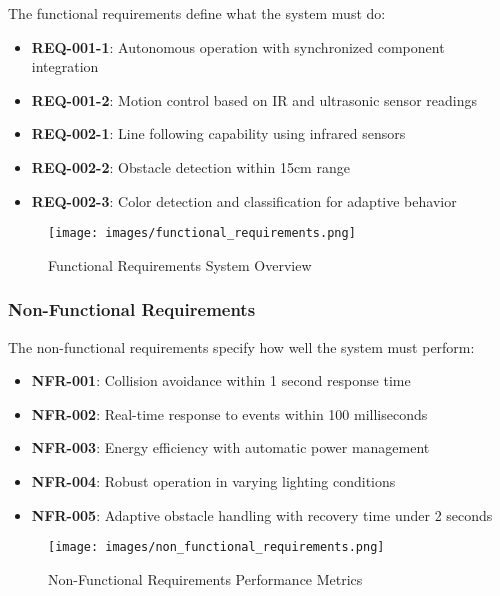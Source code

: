 \documentclass[12pt,a4paper]{article}
\begin{document}
The functional requirements define what the system must do:

\begin{itemize}
    \item \textbf{REQ-001-1}: Autonomous operation with synchronized component integration
    \item \textbf{REQ-001-2}: Motion control based on IR and ultrasonic sensor readings
    \item \textbf{REQ-002-1}: Line following capability using infrared sensors
    \item \textbf{REQ-002-2}: Obstacle detection within 15cm range
    \item \textbf{REQ-002-3}: Color detection and classification for adaptive behavior
\end{itemize}

\begin{figure}[H]
    \centering
    \texttt{[image: images/functional\_requirements.png]}
    \caption{Functional Requirements System Overview}
    \label{fig:functional_requirements}
\end{figure}

\subsubsection{Non-Functional Requirements}

The non-functional requirements specify how well the system must perform:

\begin{itemize}
    \item \textbf{NFR-001}: Collision avoidance within 1 second response time
    \item \textbf{NFR-002}: Real-time response to events within 100 milliseconds
    \item \textbf{NFR-003}: Energy efficiency with automatic power management
    \item \textbf{NFR-004}: Robust operation in varying lighting conditions
    \item \textbf{NFR-005}: Adaptive obstacle handling with recovery time under 2 seconds
\end{itemize}

\begin{figure}[H]
    \centering
    \texttt{[image: images/non\_functional\_requirements.png]}
    \caption{Non-Functional Requirements Performance Metrics}
    \label{fig:non_functional_requirements}
\end{figure}
\end{document}
